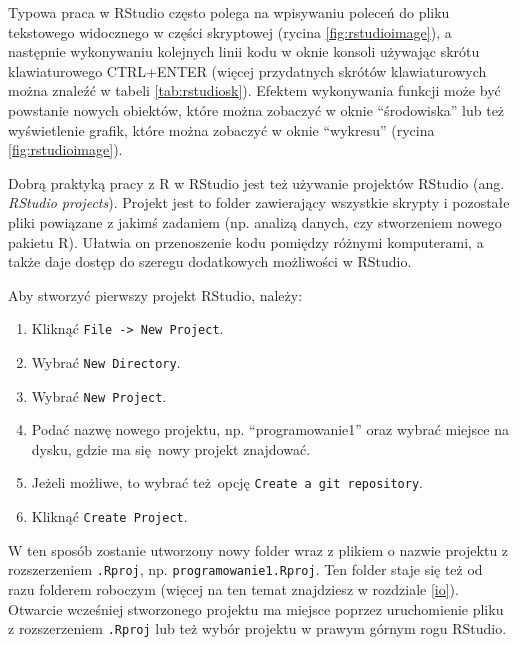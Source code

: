 \documentclass[paper=6in:9in,pagesize=pdftex,headinclude=on,footinclude=on,10pt]{scrbook}
\providecommand{\tightlist}{%
  \setlength{\itemsep}{0pt}\setlength{\parskip}{0pt}}
\begin{document}
Typowa praca w RStudio często polega na wpisywaniu poleceń do pliku tekstowego widocznego w części skryptowej (rycina \ref{fig:rstudioimage}), a następnie wykonywaniu kolejnych linii kodu w oknie konsoli używając skrótu klawiaturowego CTRL+ENTER (więcej przydatnych skrótów klawiaturowych można znaleźć w tabeli \ref{tab:rstudiosk}).
Efektem wykonywania funkcji może być powstanie nowych obiektów, które można zobaczyć w oknie ``środowiska'' lub też wyświetlenie grafik, które można zobaczyć w oknie ``wykresu'' (rycina \ref{fig:rstudioimage}).

Dobrą praktyką pracy z R w RStudio jest też używanie projektów RStudio (ang. \emph{RStudio projects}).
Projekt jest to folder zawierający wszystkie skrypty i pozostałe pliki powiązane z jakimś zadaniem (np. analizą danych, czy stworzeniem nowego pakietu R).
Ułatwia on przenoszenie kodu pomiędzy różnymi komputerami, a także daje dostęp do szeregu dodatkowych możliwości w RStudio.

Aby stworzyć pierwszy projekt RStudio, należy:

\begin{enumerate}
\def\labelenumi{\arabic{enumi}.}
\tightlist
\item
  Kliknąć \texttt{File\ -\textgreater{}\ New\ Project}.
\item
  Wybrać \texttt{New\ Directory}.
\item
  Wybrać \texttt{New\ Project}.
\item
  Podać nazwę nowego projektu, np. ``programowanie1'' oraz wybrać miejsce na dysku, gdzie ma się~nowy projekt znajdować.
\item
  Jeżeli możliwe, to wybrać też~opcję \texttt{Create\ a\ git\ repository}.
\item
  Kliknąć \texttt{Create\ Project}.
\end{enumerate}

W ten sposób zostanie utworzony nowy folder wraz z plikiem o nazwie projektu z rozszerzeniem \texttt{.Rproj}, np. \texttt{programowanie1.Rproj}.
Ten folder staje się też od razu folderem roboczym (więcej na ten temat znajdziesz w rozdziale \ref{io}).
Otwarcie wcześniej stworzonego projektu ma miejsce poprzez uruchomienie pliku z rozszerzeniem \texttt{.Rproj} lub też wybór projektu w prawym górnym rogu RStudio.
\end{document}
